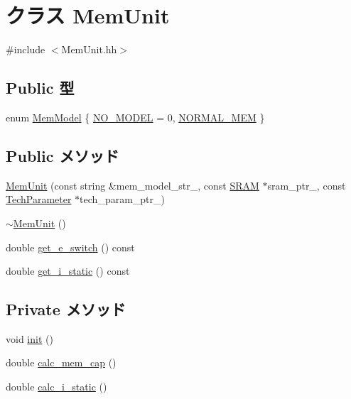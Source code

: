 \hypertarget{classMemUnit}{
\section{クラス MemUnit}
\label{classMemUnit}
}


{\ttfamily \#include $<$MemUnit.hh$>$}\subsection*{Public 型}
\begin{DoxyCompactItemize}
\item 
enum \hyperlink{classMemUnit_a91d4011a8e9d06c93676d9d208a70b62}{MemModel} \{ \hyperlink{classMemUnit_a91d4011a8e9d06c93676d9d208a70b62abab57b6e2c553e4d983f415a1f4ea75b}{NO\_\-MODEL} =  0, 
\hyperlink{classMemUnit_a91d4011a8e9d06c93676d9d208a70b62ad3379d0af95e2e9dcbcfdb016d1cf9b3}{NORMAL\_\-MEM}
 \}
\end{DoxyCompactItemize}
\subsection*{Public メソッド}
\begin{DoxyCompactItemize}
\item 
\hyperlink{classMemUnit_af6352207cf5ddd935911e4c95b79b0d5}{MemUnit} (const string \&mem\_\-model\_\-str\_\-, const \hyperlink{classSRAM}{SRAM} $\ast$sram\_\-ptr\_\-, const \hyperlink{classTechParameter}{TechParameter} $\ast$tech\_\-param\_\-ptr\_\-)
\item 
\hyperlink{classMemUnit_a7fd2ab7379a545c1aceed773db138327}{$\sim$MemUnit} ()
\item 
double \hyperlink{classMemUnit_a9872d2437aa4caa945007936b10becb1}{get\_\-e\_\-switch} () const 
\item 
double \hyperlink{classMemUnit_af4ce13e52cccc034f4f0bb0f0a6c9468}{get\_\-i\_\-static} () const 
\end{DoxyCompactItemize}
\subsection*{Private メソッド}
\begin{DoxyCompactItemize}
\item 
void \hyperlink{classMemUnit_a02fd73d861ef2e4aabb38c0c9ff82947}{init} ()
\item 
double \hyperlink{classMemUnit_a37b41e9867b9efca4ea14b3067d1af47}{calc\_\-mem\_\-cap} ()
\item 
double \hyperlink{classMemUnit_a0027807356ac4ca07fe2e593234eb884}{calc\_\-i\_\-static} ()
\end{DoxyCompactItemize}

